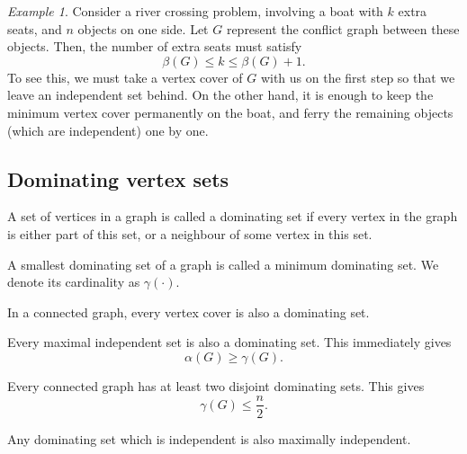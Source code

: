 \documentclass[11pt]{article}
\theoremstyle{definition}
\theoremstyle{remark}
\newtheorem*{example}{Example}
\numberwithin{equation}{section}
\begin{document}
    \begin{example}
        Consider a river crossing problem, involving a boat with $k$ extra seats, and
        $n$ objects on one side. Let $G$ represent the conflict graph between these
        objects. Then, the number of extra seats must satisfy \[
            \beta(G) \leq k \leq \beta(G) + 1.
        \] To see this, we must take a vertex cover of $G$ with us on the first step
        so that we leave an independent set behind. On the other hand, it is enough
        to keep the minimum vertex cover permanently on the boat, and ferry the
        remaining objects (which are independent) one by one.
    \end{example}

    \subsection{Dominating vertex sets}

    \begin{definition}
        A set of vertices in a graph is called a dominating set if every vertex in
        the graph is either part of this set, or a neighbour of some vertex in this
        set.
    \end{definition}

    \begin{definition}
        A smallest dominating set of a graph is called a minimum dominating set. We
        denote its cardinality as $\gamma(\cdot)$.
    \end{definition}

    \begin{lemma}
        In a connected graph, every vertex cover is also a dominating set.
    \end{lemma}

    \begin{lemma}
        Every maximal independent set is also a dominating set. This immediately
        gives \[
            \alpha(G) \geq \gamma(G).
        \] 
    \end{lemma}

    \begin{corollary}
        Every connected graph has at least two disjoint dominating sets. This gives
        \[
            \gamma(G) \leq \frac{n}{2}.
        \] 
    \end{corollary}

    \begin{lemma}
        Any dominating set which is independent is also maximally independent.
    \end{lemma}
    
\end{document}
